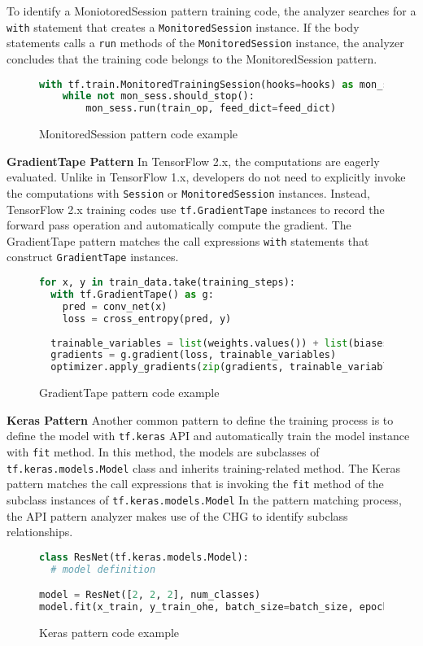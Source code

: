 To identify a MoniotoredSession pattern training code,
the analyzer searches for a {\tt with} statement that creates a
{\tt MonitoredSession} instance.
If the body statements calls a {\tt run} methods of the {\tt MonitoredSession}
instance, the analyzer concludes that the training code belongs to the
MonitoredSession pattern.

\begin{figure}[!ht]
  \begin{lstlisting}[language=Python]
with tf.train.MonitoredTrainingSession(hooks=hooks) as mon_sess:
    while not mon_sess.should_stop():
        mon_sess.run(train_op, feed_dict=feed_dict)
  \end{lstlisting}
  \label{fig:monsesspattern}
  \caption{MonitoredSession pattern code example}
\end{figure}


\textbf{GradientTape Pattern}
In TensorFlow 2.x, the computations are eagerly evaluated.
Unlike in TensorFlow 1.x, developers do not need to explicitly invoke the computations
with {\tt Session} or {\tt MonitoredSession} instances.
Instead, TensorFlow 2.x training codes use {\tt tf.GradientTape} instances
to record the forward pass operation and automatically compute the gradient.
The GradientTape pattern matches the call expressions {\tt with} statements
that construct {\tt GradientTape} instances.

\begin{figure}[!ht]
  \begin{lstlisting}[language=Python]
for x, y in train_data.take(training_steps):
  with tf.GradientTape() as g:
    pred = conv_net(x)
    loss = cross_entropy(pred, y)
    
  trainable_variables = list(weights.values()) + list(biases.values())
  gradients = g.gradient(loss, trainable_variables)
  optimizer.apply_gradients(zip(gradients, trainable_variables))
  \end{lstlisting}
  \caption{GradientTape pattern code example}
\end{figure}

\textbf{Keras Pattern}
Another common pattern to define the training process is to define
the model with {\tt tf.keras} API and automatically train the model
instance with {\tt fit} method.
In this method, the models are subclasses of {\tt tf.keras.models.Model} class
and inherits training-related method.
The Keras pattern matches the call expressions that is invoking the {\tt fit}
method of the subclass instances of {\tt tf.keras.models.Model}
In the pattern matching process, the API pattern analyzer
makes use of the CHG to identify subclass relationships. 

\begin{figure}[!ht]
  \begin{lstlisting}[language=Python]
class ResNet(tf.keras.models.Model):
  # model definition

model = ResNet([2, 2, 2], num_classes)
model.fit(x_train, y_train_ohe, batch_size=batch_size, epochs=epochs,
  \end{lstlisting}
  \caption{Keras pattern code example}
\end{figure}

